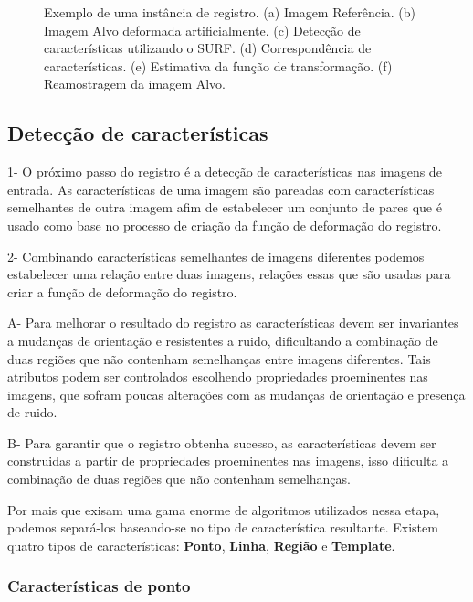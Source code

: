 \begin{figure}[H]
\begin{subfigure}[t]{0.3\textwidth}
      \label{fig:lenaRegistrada}
    \end{subfigure}
    \caption{Exemplo de uma instância de registro. (a) Imagem Referência.
             (b) Imagem Alvo deformada artificialmente.
             (c) Detecção de características utilizando o SURF.
             (d) Correspondência de características.
             (e) Estimativa da função de transformação.
             (f) Reamostragem da imagem Alvo.}
    \label{fig:regExplicacao}
\end{figure}

\subsection{Detecção de características}
\label{sec:dec_corr_carac}

1-  O próximo passo do registro é a detecção de características nas imagens de
entrada. As características de uma imagem são pareadas com características
semelhantes de outra imagem afim de estabelecer um conjunto de pares que é
usado como base no processo de criação da função de deformação do registro.

2- Combinando características semelhantes de imagens diferentes podemos
estabelecer uma relação entre duas imagens, relações essas que são usadas para
criar a função de deformação do registro.

A- Para melhorar o resultado do registro as características devem ser invariantes
a mudanças de orientação e resistentes a ruido, dificultando a combinação de
duas regiões que não contenham semelhanças entre imagens diferentes. Tais
atributos podem ser controlados escolhendo propriedades proeminentes nas
imagens, que sofram poucas alterações com as mudanças de orientação e presença
de ruido.

B- Para garantir que o registro obtenha
sucesso, as características devem ser construidas a partir de propriedades
proeminentes nas imagens, isso dificulta a combinação de duas regiões que não
contenham semelhanças.

Por mais que exisam uma gama enorme de algoritmos utilizados nessa etapa,
podemos separá-los baseando-se no tipo de característica resultante. Existem
quatro tipos de características: \textbf{Ponto}, \textbf{Linha}, \textbf{Região}
e \textbf{Template}.

\subsubsection{Características de ponto}


